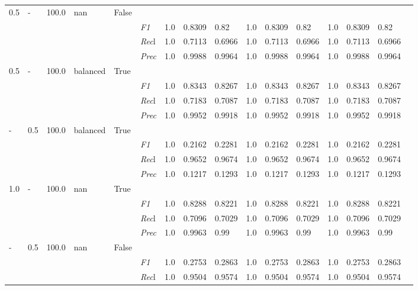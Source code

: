 \begin{table}[]
\begin{tabularx}{\textwidth}{XXXXX|X|XXX|XXX|XXXX}
    0.5 & - & 100.0 & nan & False& & & & & & & & & \\
    & & & & & \textit{F1} & 1.0 & 0.8309 & 0.82 & 1.0 & 0.8309        & 0.82        & 1.0        & 0.8309        & 0.82        \\
    & & & & & \textit{Rec}l & 1.0 & 0.7113 & 0.6966    & 1.0 & 0.7113    & 0.6966    & 1.0    & 0.7113    & 0.6966    \\
    & & & & & \textit{Prec} & 1.0 & 0.9988 & 0.9964 & 1.0 & 0.9988 & 0.9964 & 1.0 & 0.9988 & 0.9964 \\ \midrule
    0.5 & - & 100.0 & balanced & True& & & & & & & & & \\
    & & & & & \textit{F1} & 1.0 & 0.8343 & 0.8267 & 1.0 & 0.8343        & 0.8267        & 1.0        & 0.8343        & 0.8267        \\
    & & & & & \textit{Rec}l & 1.0 & 0.7183 & 0.7087    & 1.0 & 0.7183    & 0.7087    & 1.0    & 0.7183    & 0.7087    \\
    & & & & & \textit{Prec} & 1.0 & 0.9952 & 0.9918 & 1.0 & 0.9952 & 0.9918 & 1.0 & 0.9952 & 0.9918 \\ \midrule
    - & 0.5 & 100.0 & balanced & True& & & & & & & & & \\
    & & & & & \textit{F1} & 1.0 & 0.2162 & 0.2281 & 1.0 & 0.2162        & 0.2281        & 1.0        & 0.2162        & 0.2281        \\
    & & & & & \textit{Rec}l & 1.0 & 0.9652 & 0.9674    & 1.0 & 0.9652    & 0.9674    & 1.0    & 0.9652    & 0.9674    \\
    & & & & & \textit{Prec} & 1.0 & 0.1217 & 0.1293 & 1.0 & 0.1217 & 0.1293 & 1.0 & 0.1217 & 0.1293 \\ \midrule
    1.0 & - & 100.0 & nan & True& & & & & & & & & \\
    & & & & & \textit{F1} & 1.0 & 0.8288 & 0.8221 & 1.0 & 0.8288        & 0.8221        & 1.0        & 0.8288        & 0.8221        \\
    & & & & & \textit{Rec}l & 1.0 & 0.7096 & 0.7029    & 1.0 & 0.7096    & 0.7029    & 1.0    & 0.7096    & 0.7029    \\
    & & & & & \textit{Prec} & 1.0 & 0.9963 & 0.99 & 1.0 & 0.9963 & 0.99 & 1.0 & 0.9963 & 0.99 \\ \midrule
    - & 0.5 & 100.0 & nan & False& & & & & & & & & \\
    & & & & & \textit{F1} & 1.0 & 0.2753 & 0.2863 & 1.0 & 0.2753        & 0.2863        & 1.0        & 0.2753        & 0.2863        \\
    & & & & & \textit{Rec}l & 1.0 & 0.9504 & 0.9574    & 1.0 & 0.9504    & 0.9574    & 1.0    & 0.9504    & 0.9574    \\

\end{tabularx}
\end{table}
